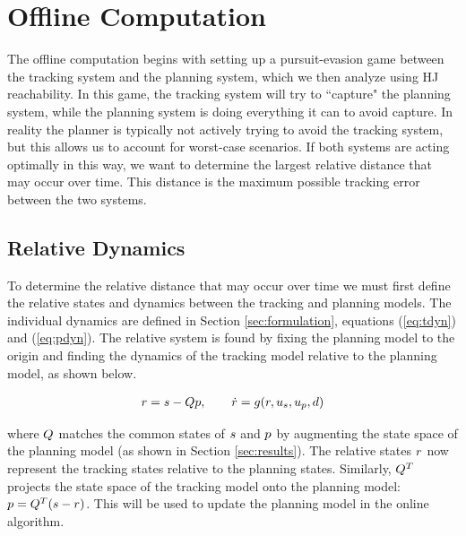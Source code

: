 \section{Offline Computation \label{sec:precomp}}
The offline computation begins with setting up a pursuit-evasion game \cite{Huang11, Chen17} between the tracking system and the planning system, which we then analyze using HJ reachability. In this game, the tracking system will try to ``capture" the planning system, while the planning system is doing everything it can to avoid capture. In reality the planner is typically not actively trying to avoid the tracking system, but this allows us to account for worst-case scenarios. If both systems are acting optimally in this way, we want to determine the largest relative distance that may occur over time. This distance is the maximum possible tracking error between the two systems.

\subsection{Relative Dynamics}
To determine the relative distance that may occur over time we must first define the relative states and dynamics between the tracking and planning models. The individual dynamics are defined in Section \ref{sec:formulation}, equations (\ref{eq:tdyn}) and (\ref{eq:pdyn}). The relative system is found by fixing the planning model to the origin and finding the dynamics of the tracking model relative to the planning model, as shown below.

\begin{equation}
\label{eq:rdyn}
\begin{aligned}
\rstate = \tstate - \ptmat\pstate, \qquad \dot\rstate = \rdyn(\rstate, \tctrl, \pctrl, \dstb)
\end{aligned}
\end{equation}

where $Q$ matches the common states of $s$ and $p$ by augmenting the state space of the planning model (as shown in Section \ref{sec:results}). The relative states $r$ now represent the tracking states relative to the planning states. Similarly, $Q^T$ projects the state space of the tracking model onto the planning model: $p = Q^T(s-r)$. This will be used to update the planning model in the online algorithm.

